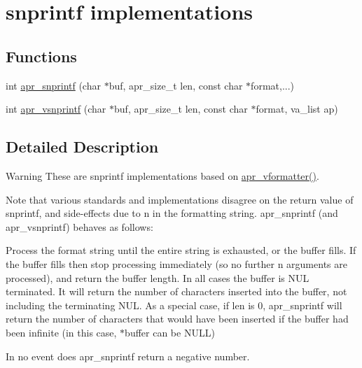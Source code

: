 \hypertarget{group___a_p_r___strings___snprintf}{\section{snprintf implementations}
\label{group___a_p_r___strings___snprintf}
}
\subsection*{Functions}
\begin{DoxyCompactItemize}
\item 
int \hyperlink{group___a_p_r___strings___snprintf_gaf0d0becc04278df5172f0ce5905f8ff9}{apr\-\_\-snprintf} (char $\ast$buf, apr\-\_\-size\-\_\-t len, const char $\ast$format,...)
\item 
int \hyperlink{group___a_p_r___strings___snprintf_gaf6bf63e240e48b517644ff3e99e49c26}{apr\-\_\-vsnprintf} (char $\ast$buf, apr\-\_\-size\-\_\-t len, const char $\ast$format, va\-\_\-list ap)
\end{DoxyCompactItemize}


\subsection{Detailed Description}
\begin{DoxyWarning}{Warning}
These are snprintf implementations based on \hyperlink{group__apr__lib_gad2cd3594aeaafd45931d1034965f48c1}{apr\-\_\-vformatter()}.
\end{DoxyWarning}
Note that various standards and implementations disagree on the return value of snprintf, and side-\/effects due to n in the formatting string. apr\-\_\-snprintf (and apr\-\_\-vsnprintf) behaves as follows\-:

Process the format string until the entire string is exhausted, or the buffer fills. If the buffer fills then stop processing immediately (so no further n arguments are processed), and return the buffer length. In all cases the buffer is N\-U\-L terminated. It will return the number of characters inserted into the buffer, not including the terminating N\-U\-L. As a special case, if len is 0, apr\-\_\-snprintf will return the number of characters that would have been inserted if the buffer had been infinite (in this case, $\ast$buffer can be N\-U\-L\-L)

In no event does apr\-\_\-snprintf return a negative number. 

